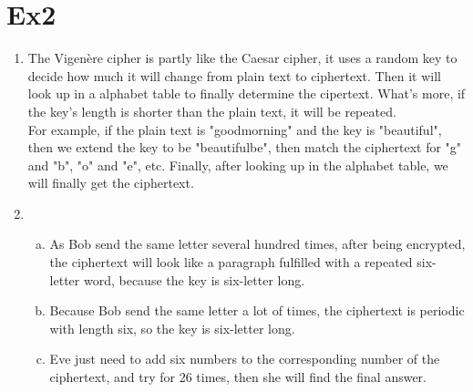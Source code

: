 \documentclass[12pt, a4paper]{article}
\begin{document}
\section{Ex2}
\begin{enumerate}
    \item The Vigenère cipher is partly like the Caesar cipher, it uses a random key to decide how much it will change from plain text
          to ciphertext. Then it will look up in a alphabet table to finally determine the cipertext. What's more, if the key's length
          is shorter than the plain text, it will be repeated.\\
          For example, if the plain text is "goodmorning" and the key is "beautiful", then we extend the key to be "beautifulbe",
          then match the ciphertext for "g" and "b", "o" and "e", etc. Finally, after looking up in the alphabet table, we will finally
          get the ciphertext.
    \item \begin{enumerate}[a)]
            \item As Bob send the same letter several hundred times, after being encrypted, the ciphertext will look like a paragraph
                  fulfilled with a repeated six-letter word, because the key is six-letter long.
            \item Because Bob send the same letter a lot of times, the ciphertext is periodic with length six, so the key is
                  six-letter long.
            \item Eve just need to add six numbers to the corresponding number of the ciphertext, and try for 26 times, then she will
                  find the final answer.
          \end{enumerate}
\end{enumerate}

\newpage
\end{document}

